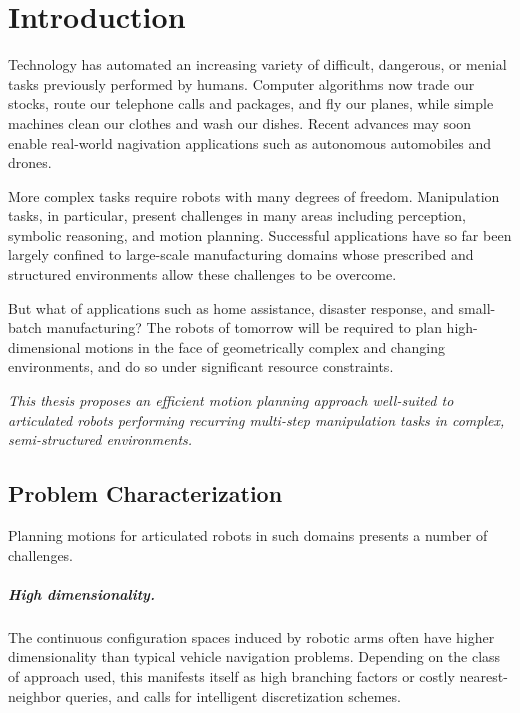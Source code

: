 \chapter{Introduction}
\label{chap:intro}


Technology has automated an increasing variety of
difficult, dangerous, or menial tasks
previously performed by humans.
Computer algorithms now trade our stocks,
route our telephone calls and packages,
and fly our planes,
while simple machines clean our clothes and wash our dishes.
Recent advances may soon enable real-world nagivation applications
such as autonomous automobiles and drones.

More complex tasks require robots with many degrees of freedom.
Manipulation tasks, in particular,
present challenges in many areas including
perception, symbolic reasoning, and motion planning.
Successful applications have so far been largely
confined to large-scale manufacturing domains
whose prescribed and structured environments
allow these challenges to be overcome.

But what of applications such as
home assistance, disaster response, and small-batch manufacturing?
The robots of tomorrow will be required to plan
high-dimensional motions
in the face of geometrically complex and changing environments,
and do so under significant resource constraints.


\begin{adjustwidth}{0.3in}{0.3in}
\emph{%
This thesis proposes an
efficient motion planning approach
well-suited
to articulated robots
performing recurring multi-step manipulation tasks
in complex, semi-structured environments.
}
\end{adjustwidth}

\section{Problem Characterization}

Planning motions for articulated robots in such domains
presents a number of challenges.

\paragraph{High dimensionality.}
The continuous configuration spaces induced by robotic arms
often have higher dimensionality than typical vehicle navigation
problems.
Depending on the class of approach used,
this manifests itself as high branching factors
or costly nearest-neighbor queries,
and calls for intelligent discretization schemes.

